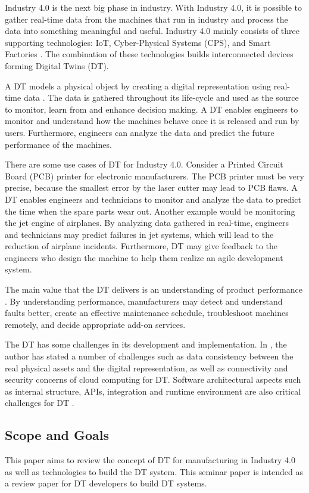 \documentclass[article,table]{aaltoseries}
\begin{document}
Industry 4.0 is the next big phase in industry. With Industry 4.0, it is possible to gather real-time data from the machines that run in industry and process the data into something meaningful and useful. Industry 4.0 mainly consists of three supporting technologies: IoT, Cyber-Physical Systems (CPS), and Smart Factories \cite{hermann2016design}. The combination of these technologies builds interconnected devices forming Digital Twins (DT).

A DT models a physical object by creating a digital representation using real-time data \cite{Cheatshe3:online}. The data is gathered throughout its life-cycle and used as the source to monitor, learn from and enhance decision making. A DT enables engineers to monitor and understand how the machines behave once it is released and run by users. Furthermore, engineers can analyze the data and predict the future performance of the machines.

There are some use cases of DT for Industry 4.0. Consider a Printed Circuit Board (PCB) printer for electronic manufacturers. The PCB printer must be very precise, because the smallest error by the laser cutter may lead to PCB flaws. A DT enables engineers and technicians to monitor and analyze the data to predict the time when the spare parts wear out. Another example would be monitoring the jet engine of airplanes. By analyzing data gathered in real-time, engineers and technicians may predict failures in jet systems, which will lead to the reduction of airplane incidents. Furthermore, DT may give feedback to the engineers who design the machine to help them realize an agile development system.

The main value that the DT delivers is an understanding of product performance \cite{Cheatshe3:online}. By understanding performance, manufacturers may detect and understand faults better, create an effective maintenance schedule, troubleshoot machines remotely, and decide appropriate add-on services.

The DT has some challenges in its development and implementation. In \cite{bienhaus2017patterns}, the author has stated a number of challenges such as data consistency between the real physical assets and the digital representation, as well as connectivity and security concerns of cloud computing for DT. Software architectural aspects such as internal structure, APIs, integration and runtime environment are also critical challenges for DT \cite{malakuti2018architectural}.

\subsection{Scope and Goals}
\label{sec:emphasis}
This paper aims to review the concept of DT for manufacturing in Industry 4.0 as well as technologies to build the DT system. This seminar paper is intended as a review paper for DT developers to build DT systems.
\end{document}
